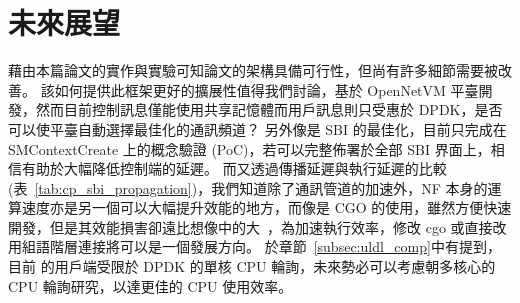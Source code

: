 \chapter{未來展望}
\label{chapter:future}


藉由本篇論文的實作與實驗可知論文的架構具備可行性，但尚有許多細節需要被改善。
該如何提供此框架更好的擴展性值得我們討論，\LHCN 基於 OpenNetVM 平臺開發，然而目前控制訊息僅能使用共享記憶體而用戶訊息則只受惠於 DPDK，是否可以使平臺自動選擇最佳化的通訊頻道？
另外像是 SBI 的最佳化，目前只完成在 SMContextCreate 上的概念驗證 (PoC)，若可以完整佈署於全部 SBI 界面上，相信有助於大幅降低控制端的延遲。
而又透過傳播延遲與執行延遲的比較 (表~\ref{tab:cp_sbi_propagation})，我們知道除了通訊管道的加速外，NF 本身的運算速度亦是另一個可以大幅提升效能的地方，而像是 CGO 的使用，雖然方便快速開發，但是其效能損害卻遠比想像中的大~\cite{cgo_not_go}，為加速執行效率，修改 cgo 或直接改用組語階層連接將可以是一個發展方向。
於章節~\ref{subsec:uldl_comp}中有提到，目前 \LHCN 的用戶端受限於 DPDK 的單核 CPU 輪詢，未來勢必可以考慮朝多核心的 CPU 輪詢研究，以達更佳的 CPU 使用效率。
